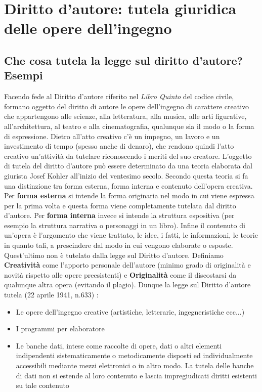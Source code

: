 \newpage
\section{Diritto d'autore: tutela giuridica delle opere dell'ingegno}

\subsection{Che cosa tutela la legge sul diritto d'autore? Esempi}
Facendo fede al Diritto d'autore riferito nel \textit{Libro Quinto} del codice civile,
formano oggetto del diritto di autore le opere dell'ingegno di carattere
creativo che appartengono alle scienze, alla letteratura, alla musica, alle
arti figurative, all'architettura, al teatro e alla cinematografia, qualunque
sia il modo o la forma di espressione.\newline
Dietro all'atto creativo c'è un impegno, un lavoro e un investimento di
tempo (spesso anche di denaro), che rendono quindi l'atto creativo un'attività
da tutelare riconoscendo i meriti del suo creatore. L'oggetto di tutela del diritto
d'autore può essere determinato da una teoria elaborata dal giurista
Josef Kohler all'inizio del ventesimo secolo.\newline
Secondo questa teoria si fa una distinzione tra forma esterna, forma interna
e contenuto dell'opera creativa. Per \textbf{forma esterna} si intende la forma
originaria nel modo in cui viene espressa per la prima volta e questa
forma viene completamente tutelata dal diritto d'autore. Per \textbf{forma interna}
invece si intende la struttura espositiva (per esempio la struttura narrativa o
personaggi in un libro). Infine il contenuto di un'opera è l'argomento che viene
trattato, le idee, i fatti, le informazioni, le teorie in quanto tali,
a prescindere dal modo in cui vengono elaborate o esposte. Quest'ultimo
non è tutelato dalla legge sul Diritto d'autore. \newline
Definiamo \textbf{Creatività} come l'apporto personale dell'autore (minimo
grado di originalità e novità rispetto alle opere preesistenti) e \textbf{Originalità}
come il discostarsi da qualunque altra opera (evitando il plagio). Dunque
la legge sul Diritto d'autore tutela (22 aprile 1941, n.633) :
\begin{itemize}
    \item Le opere dell'ingegno creative (artistiche, letterarie, ingegneristiche ecc...)
    \item I programmi per elaboratore
    \item Le banche dati, intese come raccolte di opere, dati o altri elementi
    indipendenti sistematicamente o metodicamente disposti ed individualmente
    accessibili mediante mezzi elettronici o in altro modo. La tutela delle banche
    di dati non si estende al loro contenuto e lascia impregiudicati diritti esistenti
    su tale contenuto
\end{itemize}
